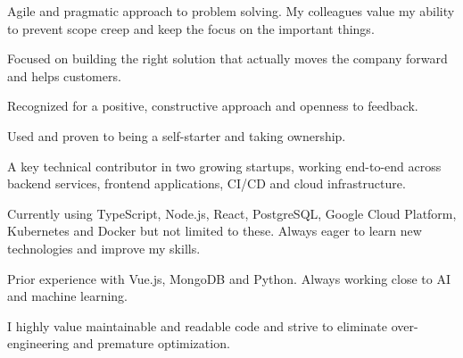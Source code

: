 \documentclass[8pt]{developercv} %
\begin{document}
\vspace{0.5cm}



\begin{minipage}[t]{0.45\textwidth} %
	\vspace{-\baselineskip} %

	Agile and pragmatic approach to problem solving. My colleagues value my ability to prevent scope creep and keep the focus on the important things.

	Focused on building the right solution that actually moves the company forward and helps customers.

	Recognized for a positive, constructive approach and openness to feedback.

	Used and proven to being a self-starter and taking ownership.

\end{minipage}
\hfill %
\begin{minipage}[t]{0.45\textwidth} %
	\vspace{-\baselineskip} %

	A key technical contributor in two growing startups, working end-to-end across backend services, frontend applications, CI/CD and cloud infrastructure.

	Currently using TypeScript, Node.js, React, PostgreSQL, Google Cloud Platform, Kubernetes and Docker but not limited to these. Always eager to learn new technologies and improve my skills.

	Prior experience with Vue.js, MongoDB and Python. Always working close to AI and machine learning.
	
	I highly value maintainable and readable code and strive to eliminate over-engineering and premature optimization.
\end{minipage}


\end{document}
